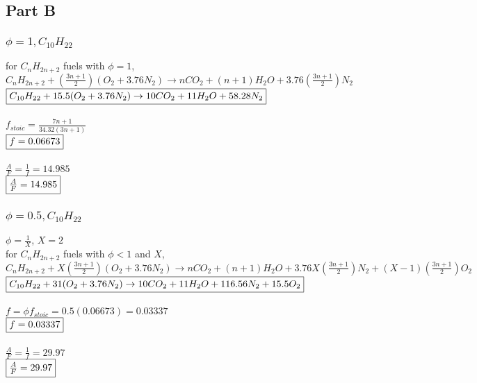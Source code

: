 \documentclass{article}
\begin{document}
\subsection*{Part B}
\subsubsection*{$\phi=1, C_{10}H_{22}$}
for $C_nH_{2n+2}$ fuels with $\phi=1$, \\
$C_nH_{2n+2}+(\frac{3n+1}{2})(O_2+3.76N_2) \rightarrow nCO_2 + (n+1)H_2O +3.76(\frac{3n+1}{2})N_2$ \\
$\fbox{$C_{10}H_{22}+15.5(O_2+3.76N_2) \rightarrow 10CO_2+11H_2O+58.28N_2$}$ \\\\
$f_{stoic}=\frac{7n+1}{34.32(3n+1)}$ \\
$\fbox{$f=0.06673$}$ \\\\
$\frac{A}{F}=\frac{1}{f}=14.985$ \\
$\fbox{$\frac{A}{F}=14.985$}$

\subsubsection*{$\phi=0.5, C_{10}H_{22}$}
$\phi=\frac{1}{X}$, $X=2$ \\
for $C_nH_{2n+2}$ fuels with $\phi<1$ and $X$, \\
$C_nH_{2n+2}+X(\frac{3n+1}{2})(O_2+3.76N_2) \rightarrow nCO_2 + (n+1)H_2O +3.76X(\frac{3n+1}{2})N_2 +
(X-1)(\frac{3n+1}{2})O_2$ \\
$\fbox{$C_{10}H_{22}+31(O_2+3.76N_2) \rightarrow 10CO_2+11H_2O+116.56N_2+15.5O_2$}$ \\\\
$f=\phi f_{stoic}=0.5(0.06673)=0.03337$ \\
$\fbox{$f=0.03337$}$ \\\\
$\frac{A}{F}=\frac{1}{f}=29.97$ \\
$\fbox{$\frac{A}{F}=29.97$}$
\end{document}
